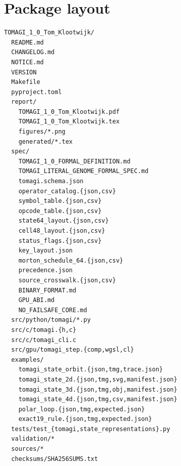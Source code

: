 \documentclass[11pt,a4paper]{article}
\begin{document}
\section{Package layout}
\begin{lstlisting}
TOMAGI_1_0_Tom_Klootwijk/
  README.md
  CHANGELOG.md
  NOTICE.md
  VERSION
  Makefile
  pyproject.toml
  report/
    TOMAGI_1_0_Tom_Klootwijk.pdf
    TOMAGI_1_0_Tom_Klootwijk.tex
    figures/*.png
    generated/*.tex
  spec/
    TOMAGI_1_0_FORMAL_DEFINITION.md
    TOMAGI_LITERAL_GENOME_FORMAL_SPEC.md
    tomagi.schema.json
    operator_catalog.{json,csv}
    symbol_table.{json,csv}
    opcode_table.{json,csv}
    state64_layout.{json,csv}
    cell48_layout.{json,csv}
    status_flags.{json,csv}
    key_layout.json
    morton_schedule_64.{json,csv}
    precedence.json
    source_crosswalk.{json,csv}
    BINARY_FORMAT.md
    GPU_ABI.md
    NO_FAILSAFE_CORE.md
  src/python/tomagi/*.py
  src/c/tomagi.{h,c}
  src/c/tomagi_cli.c
  src/gpu/tomagi_step.{comp,wgsl,cl}
  examples/
    tomagi_state_orbit.{json,tmg,trace.json}
    tomagi_state_2d.{json,tmg,svg,manifest.json}
    tomagi_state_3d.{json,tmg,obj,manifest.json}
    tomagi_state_4d.{json,tmg,csv,manifest.json}
    polar_loop.{json,tmg,expected.json}
    exact19_rule.{json,tmg,expected.json}
  tests/test_{tomagi,state_representations}.py
  validation/*
  sources/*
  checksums/SHA256SUMS.txt
\end{lstlisting}
\end{document}
